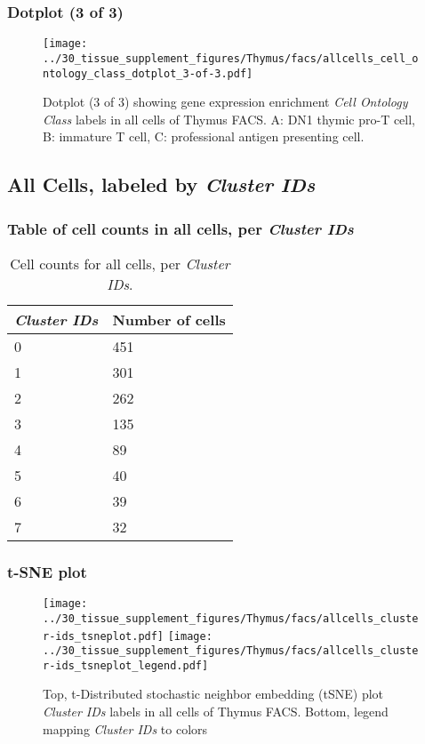 \clearpage

\subsubsection{Dotplot (3 of 3)}
\begin{figure}[h]
\centering
\texttt{[image: ../30\_tissue\_supplement\_figures/Thymus/facs/allcells\_cell\_ontology\_class\_dotplot\_3-of-3.pdf]}

\caption{ Dotplot (3 of 3)  showing gene expression enrichment \emph{Cell Ontology Class} labels in all cells of Thymus FACS. A: DN1 thymic pro-T cell, B: immature T cell, C: professional antigen presenting cell.}
\end{figure}


\clearpage

\subsection{All Cells, labeled by \emph{Cluster IDs}}
\subsubsection{Table of cell counts in all cells, per \emph{Cluster IDs}}\begin{table}[h]
\centering
\label{my-label}
\begin{tabular}{@{}ll@{}}
\toprule

\emph{Cluster IDs}& Number of cells \\ \midrule
0 & 451 \\

1 & 301 \\

2 & 262 \\

3 & 135 \\

4 & 89 \\

5 & 40 \\

6 & 39 \\

7 & 32 \\
\bottomrule
\end{tabular}
\caption{Cell counts for all cells, per \emph{Cluster IDs}.}
\end{table}

\clearpage
\subsubsection{t-SNE plot}
\begin{figure}[h]
\centering
\texttt{[image: ../30\_tissue\_supplement\_figures/Thymus/facs/allcells\_cluster-ids\_tsneplot.pdf]}
\texttt{[image: ../30\_tissue\_supplement\_figures/Thymus/facs/allcells\_cluster-ids\_tsneplot\_legend.pdf]}
\caption{Top, t-Distributed stochastic neighbor embedding (tSNE) plot  \emph{Cluster IDs} labels in all cells of Thymus FACS. Bottom, legend mapping \emph{Cluster IDs} to colors}
\end{figure}


